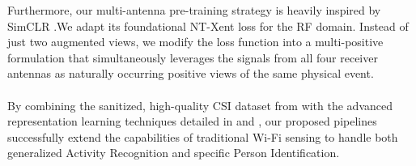 Furthermore, our multi-antenna pre-training strategy is heavily inspired by SimCLR \cite{SimCLR}.We adapt its foundational NT-Xent loss for the RF domain. Instead of just two augmented views, we modify the loss function into a multi-positive formulation that simultaneously leverages the signals from all four receiver antennas as naturally occurring positive views of the same physical event.
\\\\
By combining the sanitized, high-quality CSI dataset from \cite{data, dataset} with the advanced representation learning techniques detailed in \cite{contrastive} and \cite{supcon}, our proposed pipelines successfully extend the capabilities of traditional Wi-Fi sensing to handle both generalized Activity Recognition and specific Person Identification.